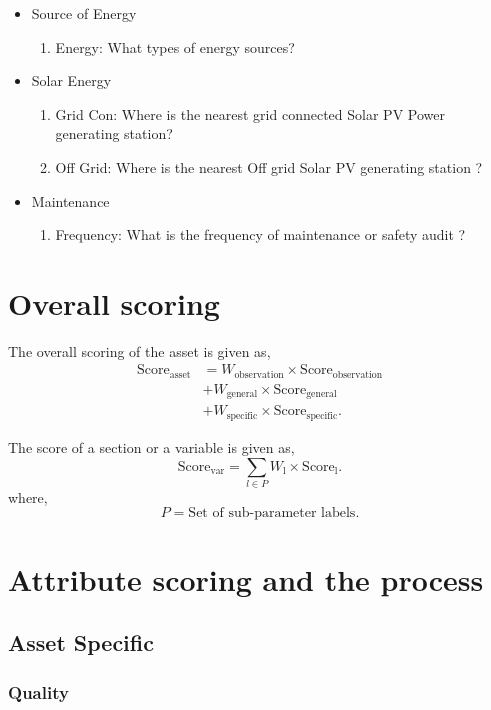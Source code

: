 \documentclass[oneside,twocolumn]{article}
\newcommand{\tsub}[2]{\text{#1}_{\text{#2}}}
\newcommand{\tsubb}[2]{#1_{\text{#2}}}
\begin{document}
\begin{itemize}
\begin{itemize}
\item Source of Energy
\begin{enumerate}
\item Energy: What types of energy sources?
\end{enumerate}

\item Solar Energy
\begin{enumerate}
\item Grid Con: Where is the nearest grid connected Solar PV Power generating station?
\item Off Grid: Where is the nearest Off grid Solar PV generating station ?
\end{enumerate}

\item Maintenance
\begin{enumerate}
\item Frequency: What is the frequency of  maintenance or safety audit ?
\end{enumerate}

\end{itemize}

    \end{itemize}
\section{Overall scoring}
The overall scoring of the asset is given as,
\begin{align*}
	\tsub{Score}{asset} &= \tsubb{W}{observation} \times \tsub{Score}{observation} \\
	&+ \tsubb{W}{general} \times \tsub{Score}{general} \\
	&+ \tsubb{W}{specific} \times \tsub{Score}{specific}.
\end{align*}

The score of a section or a variable is given as,
\[
	\tsub{Score}{var} = \sum_{l \in P} \tsubb{W}{l} \times \tsub{Score}{l}.
\]
where,
\[
	P = \text{Set of sub-parameter labels.}
\]
\section{Attribute scoring and the
process}
\subsection{Asset Specific}
\subsubsection{Quality}
\end{document}
